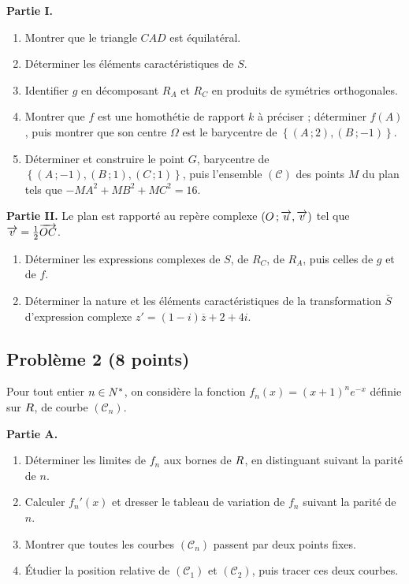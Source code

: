 \medskip
\textbf{Partie I.}
\begin{enumerate}[label=\textbf{\arabic*.}, leftmargin=*, itemsep=0.2em]
  \item Montrer que le triangle $CAD$ est équilatéral.
  \item Déterminer les éléments caractéristiques de $S$.
  \item Identifier $g$ en décomposant $R_{A}$ et $R_{C}$ en produits de
        symétries orthogonales.
  \item Montrer que $f$ est une homothétie de rapport $k$ à préciser ;
        déterminer $f(A)$, puis montrer que son centre $\Omega$ est le
        barycentre de $\left\{(A\,;2),(B\,;-1)\right\}$.
  \item Déterminer et construire le point $G$, barycentre de
        $\left\{(A\,;-1),(B\,;1),(C\,;1)\right\}$, puis l'ensemble
        $(\mathcal C)$ des points $M$ du plan tels que
        $-MA^{2}+MB^{2}+MC^{2} = 16$.
\end{enumerate}

\medskip
\textbf{Partie II.} Le plan est rapporté au repère complexe
$\left(O\,;\overrightarrow{u},\overrightarrow{v}\right)$ tel que $\overrightarrow{v} = \frac12\overrightarrow{OC}$.
\begin{enumerate}[label=\textbf{\arabic*.}, leftmargin=*, itemsep=0.2em, start=6]
  \item Déterminer les expressions complexes de $S$, de $R_{C}$, de $R_{A}$,
        puis celles de $g$ et de $f$.
  \item Déterminer la nature et les éléments caractéristiques de la
        transformation $\bar S$ d'expression complexe
        $z' = (1-i)\overline z+2+4i$.
\end{enumerate}

\subsection*{Problème 2 \textnormal{(8 points)}}

Pour tout entier $n \in N^{*}$, on considère la fonction
$f_{n}(x) = (x+1)^{n}e^{-x}$ définie sur $R$, de courbe
$(\mathcal C_{n})$.

\medskip
\textbf{Partie A.}
\begin{enumerate}[label=\textbf{\arabic*.}, leftmargin=*, itemsep=0.2em]
  \item Déterminer les limites de $f_{n}$ aux bornes de $R$, en distinguant
        suivant la parité de $n$.
  \item Calculer $f_{n}'(x)$ et dresser le tableau de variation de $f_{n}$
        suivant la parité de $n$.
  \item Montrer que toutes les courbes $(\mathcal C_{n})$ passent par deux
        points fixes.
  \item Étudier la position relative de $(\mathcal C_{1})$ et
        $(\mathcal C_{2})$, puis tracer ces deux courbes.
\end{enumerate}

